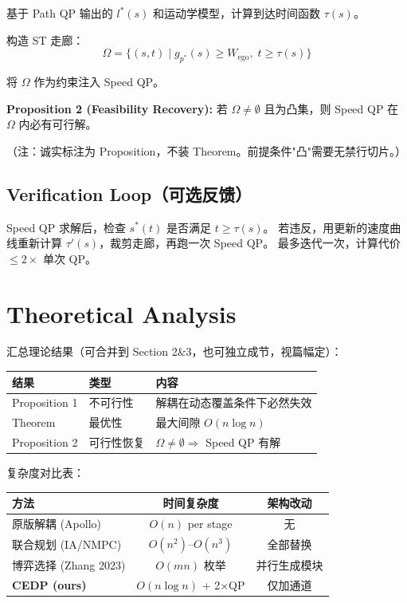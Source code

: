 \documentclass[a4paper,12pt]{article}
\begin{document}
基于 Path QP 输出的 $l^*(s)$ 和运动学模型，计算到达时间函数 $\tau(s)$。

构造 ST 走廊：
\[
\Omega = \{(s,t) \mid g_{p^*}(s) \geq W_{\text{ego}},\; t \geq \tau(s)\}
\]

将 $\Omega$ 作为约束注入 Speed QP。

\textbf{Proposition 2 (Feasibility Recovery):}
若 $\Omega \neq \emptyset$ 且为凸集，则 Speed QP 在 $\Omega$ 内必有可行解。

（注：诚实标注为 Proposition，不装 Theorem。前提条件"凸"需要无禁行切片。）

\subsection{Verification Loop（可选反馈）}

Speed QP 求解后，检查 $s^*(t)$ 是否满足 $t \geq \tau(s)$。
若违反，用更新的速度曲线重新计算 $\tau'(s)$，裁剪走廊，再跑一次 Speed QP。
最多迭代一次，计算代价 $\leq 2\times$ 单次 QP。

\section{Theoretical Analysis}

汇总理论结果（可合并到 Section 2\&3，也可独立成节，视篇幅定）：

\begin{table}[h]
\centering
\begin{tabular}{lll}
\toprule
结果 & 类型 & 内容 \\
\midrule
Proposition 1 & 不可行性 & 解耦在动态覆盖条件下必然失效 \\
Theorem & 最优性 & 最大间隙 $O(n\log n)$ \\
Proposition 2 & 可行性恢复 & $\Omega \neq \emptyset \Rightarrow$ Speed QP 有解 \\
\bottomrule
\end{tabular}
\end{table}

复杂度对比表：
\begin{table}[h]
\centering
\begin{tabular}{lcc}
\toprule
方法 & 时间复杂度 & 架构改动 \\
\midrule
原版解耦 (Apollo) & $O(n)$ per stage & 无 \\
联合规划 (IA/NMPC) & $O(n^2)$--$O(n^3)$ & 全部替换 \\
博弈选择 (Zhang 2023) & $O(mn)$ 枚举 & 并行生成模块 \\
\textbf{CEDP (ours)} & $O(n \log n)$ + 2$\times$QP & 仅加通道 \\
\bottomrule
\end{tabular}
\end{table}
\end{document}
